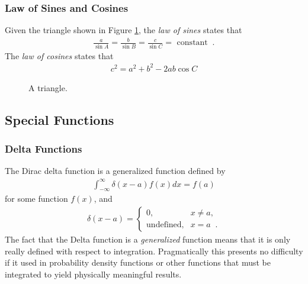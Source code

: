 \documentclass[11pt]{article}
\begin{document}
\subsubsection{Law of Sines and Cosines}
\label{sec:orgheadline63}
Given the triangle shown in Figure \ref{fig::triangle}, the \emph{law of sines} states that
\begin{align}
  \frac{a}{\sin A} = \frac{b}{\sin B} = \frac{c}{\sin C} = \text{ constant} \;\;.
\end{align}
The \emph{law of cosines} states that
\begin{align}
  c^2 = a^2 + b^2 - 2ab\cos{C}
\end{align}

\begin{figure}
\centering
{}
\caption{A triangle.}
\label{fig::triangle}
\end{figure}
\subsection{Special Functions}
\label{sec:orgheadline67}
\subsubsection{Delta Functions}
\label{sec:orgheadline65}
The Dirac delta function is a generalized function defined by
\begin{align}
  \int_{-\infty}^\infty \delta(x-a) f(x) dx = f(a)
\end{align}
for some function \(f(x)\), and
\begin{align}
  \delta(x-a) = 
  \begin{cases}
    0, & x\neq a, \\
    \text{undefined}, & x=a \;\;.
  \end{cases}
\end{align}
The fact that the Delta function is a \emph{generalized} function means that it is only really defined with respect to integration.  Pragmatically this presents no difficulty if it used in probability density functions or other functions that must be integrated to yield physically meaningful results.
\end{document}

